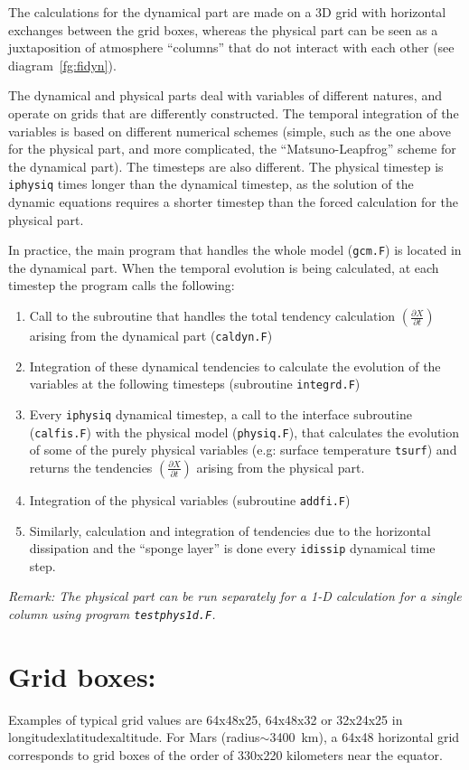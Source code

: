 The calculations for the dynamical part are made on a 3D grid
with horizontal exchanges between the grid boxes,
whereas the physical part can be seen as a juxtaposition of atmosphere
``columns'' that do not interact with each other (see diagram~\ref{fg:fidyn}).

The dynamical and physical parts deal with variables of different natures,
and operate on grids that are differently constructed.
The temporal integration of the variables is based
on different numerical schemes
(simple, such as the one above for the physical part,
and more complicated, the ``Matsuno-Leapfrog'' scheme for the dynamical part).
The timesteps are also different.
The physical timestep  is {\tt iphysiq} times longer than the dynamical
timestep, as the solution of the dynamic equations requires a shorter timestep
than the forced calculation for the physical part.

In practice, the main program that handles the whole model (\verb+gcm.F+)
is located in the dynamical part.
When the temporal evolution is being calculated,
at each timestep the program calls the following:
\begin{enumerate}
\item Call to the subroutine that handles the total tendency calculation
$(\frac{\partial X}{\partial t})$ arising from the dynamical part
(\verb+caldyn.F+)
\item Integration of these dynamical tendencies to calculate the evolution
of the variables at the following timesteps (subroutine \verb+integrd.F+)
\item Every {\tt iphysiq} dynamical timestep, a call to the interface
subroutine (\verb+calfis.F+) with the physical model (\verb+physiq.F+),
that calculates the evolution of some of the purely physical variables
(e.g: surface temperature {\tt tsurf}) and returns the tendencies  
$(\frac{\partial X}{\partial t})$
arising from the physical part.
\item Integration of the physical variables (subroutine \verb+addfi.F+)
\item Similarly, calculation and integration of tendencies due to
the horizontal dissipation and the ``sponge layer'' is done
every {\tt idissip} dynamical time step.
\end{enumerate} 
{\em {Remark:} The physical part can be run separately for a 1-D calculation
for a single column using program \verb+testphys1d.F+.} 
 

\section{Grid boxes:} Examples of typical grid values are 64x48x25,
64x48x32 or 32x24x25 in longitudexlatitudexaltitude.
For Mars (radius$\sim$3400~km), a 64x48 horizontal grid corresponds
to grid boxes of the order of 330x220 kilometers near the equator.


